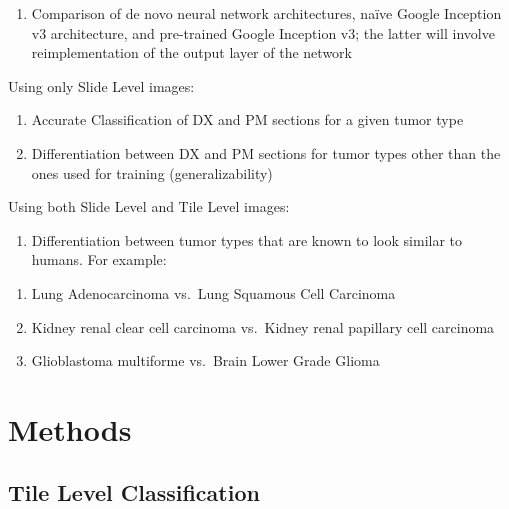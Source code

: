 \documentclass[12pt,]{article}
\providecommand{\tightlist}{%
  \setlength{\itemsep}{0pt}\setlength{\parskip}{0pt}}
\begin{document}
\begin{enumerate}
\def\labelenumi{\arabic{enumi})}
\tightlist
\item
  Comparison of de novo neural network architectures, naïve Google
  Inception v3 architecture, and pre-trained Google Inception v3; the
  latter will involve reimplementation of the output layer of the
  network
\end{enumerate}

Using only Slide Level images:

\begin{enumerate}
\def\labelenumi{\arabic{enumi})}
\setcounter{enumi}{1}
\tightlist
\item
  Accurate Classification of DX and PM sections for a given tumor type
\item
  Differentiation between DX and PM sections for tumor types other than
  the ones used for training (generalizability)
\end{enumerate}

Using both Slide Level and Tile Level images:

\begin{enumerate}
\def\labelenumi{\arabic{enumi})}
\setcounter{enumi}{3}
\tightlist
\item
  Differentiation between tumor types that are known to look similar to
  humans. For example:
\end{enumerate}

\begin{enumerate}
\def\labelenumi{\alph{enumi}.}
\tightlist
\item
  Lung Adenocarcinoma vs.~Lung Squamous Cell Carcinoma
\item
  Kidney renal clear cell carcinoma vs.~Kidney renal papillary cell
  carcinoma
\item
  Glioblastoma multiforme vs.~Brain Lower Grade Glioma
\end{enumerate}

\section{Methods}\label{methods}

\subsection{Tile Level Classification}\label{tile-level-classification}
\end{document}
